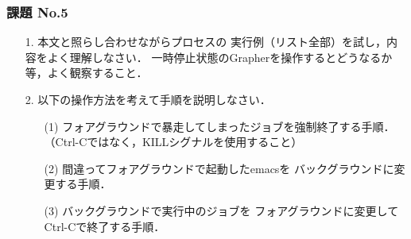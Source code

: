 \documentclass{beamer}                 %
\begin{document}
\begin{frame}[fragile]
  \frametitle{課題 No.5}
  \begin{enumerate}
    \item[1.] 本文と照らし合わせながらプロセスの
    実行例（リスト全部）を試し，内容をよく理解しなさい．
    一時停止状態のGrapherを操作するとどうなるか等，よく観察すること．
  \item[2.] 以下の操作方法を考えて手順を説明しなさい．
    \begin{enumerate}
    \item[(1)] フォアグラウンドで暴走してしまったジョブを強制終了する手順．
      （Ctrl-Cではなく，KILLシグナルを使用すること）
    \item[(2)] 間違ってフォアグラウンドで起動したemacsを
      バックグラウンドに変更する手順．
    \item[(3)] バックグラウンドで実行中のジョブを
      フォアグラウンドに変更してCtrl-Cで終了する手順．
    \end{enumerate}
  \end{enumerate}
\end{frame}
\end{document}
